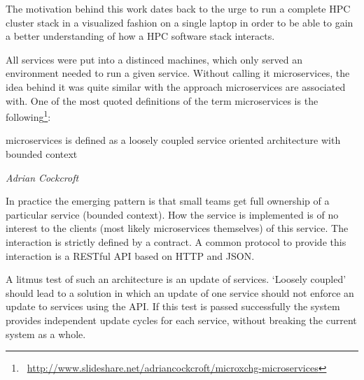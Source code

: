 The motivation behind this work dates back to the urge to run a complete HPC cluster stack in a visualized fashion on a single laptop in order to be able to gain a better understanding of how a HPC software stack interacts.

All services were put into a distinced machines, which only served an environment needed to run a given service.
Without calling it microservices, the idea behind it was quite similar with the approach microservices are associated with.
One of the most quoted definitions of the term microservices is the following\footnote{\Mundus~\url{http://www.slideshare.net/adriancockcroft/microxchg-microservices}}:
\epigraph{microservices is defined as a loosely coupled service oriented architecture with bounded context}{\textit{Adrian Cockcroft}}
In practice the emerging pattern is that small teams get full ownership of a particular service (bounded context).
How the service is implemented is of no interest to the clients (most likely microservices themselves) of this service.
The interaction is strictly defined by a contract. A common protocol to provide this interaction is a RESTful API based on HTTP and JSON.

A litmus test of such an architecture is an update of services. `Loosely coupled' should lead to a solution in which an update of one service
should not enforce an update to services using the API. If this test is passed successfully the system provides
independent update cycles for each service, without breaking the current system as a whole.

